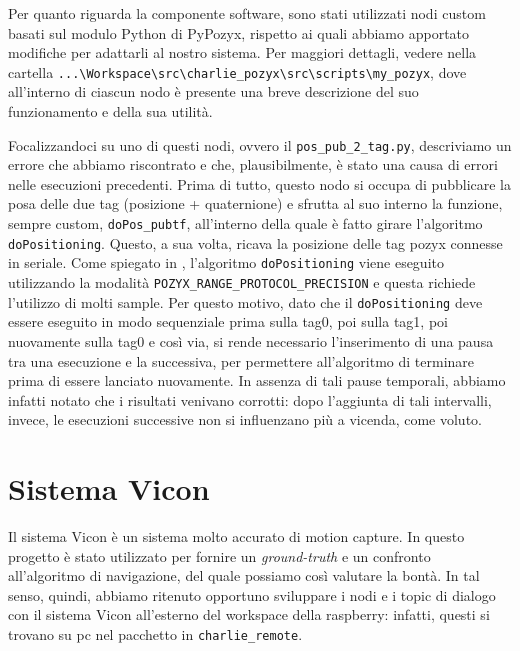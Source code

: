 Per quanto riguarda la componente software, sono stati utilizzati nodi custom basati sul modulo Python di PyPozyx, rispetto ai quali abbiamo apportato modifiche per adattarli al nostro sistema. Per maggiori dettagli, vedere nella cartella \verb|...\Workspace\src\charlie_pozyx\src\scripts\my_pozyx|, dove all'interno di ciascun nodo è presente una breve descrizione del suo funzionamento e della sua utilità.

Focalizzandoci su uno di questi nodi, ovvero il \verb|pos_pub_2_tag.py|, descriviamo un errore che abbiamo riscontrato e che, plausibilmente, è stato una causa di errori nelle esecuzioni precedenti. Prima di tutto, questo nodo si occupa di pubblicare la posa delle due tag (posizione + quaternione) e sfrutta al suo interno la funzione, sempre custom, \verb|doPos_pubtf|, all'interno della quale è fatto girare l'algoritmo \verb|doPositioning|. Questo, a sua volta, ricava la posizione delle tag pozyx connesse in seriale. Come spiegato in \cite{ctesconistudio}, l'algoritmo \verb|doPositioning| viene eseguito utilizzando la modalità \verb|POZYX_RANGE_PROTOCOL_PRECISION| e questa richiede l'utilizzo di molti sample. Per questo motivo, dato che il \verb|doPositioning| deve essere eseguito in modo sequenziale prima sulla tag0, poi sulla tag1, poi nuovamente sulla tag0 e così via, si rende necessario l'inserimento di una pausa tra una esecuzione e la successiva, per permettere all'algoritmo di terminare prima di essere lanciato nuovamente. In assenza di tali pause temporali, abbiamo infatti notato che i risultati venivano corrotti: dopo l'aggiunta di tali intervalli, invece, le esecuzioni successive non si influenzano più a vicenda, come voluto.


\section{Sistema Vicon}
\label{sez:Sistema Vicon}

Il sistema Vicon è un sistema molto accurato di motion capture. 
In questo progetto è stato utilizzato per fornire un \textit{ground-truth} e un confronto all'algoritmo di navigazione, del quale possiamo così valutare la bontà. 
In tal senso, quindi, abbiamo ritenuto opportuno sviluppare i nodi e i topic di dialogo con il sistema Vicon all'esterno del workspace della raspberry: infatti, questi si trovano su pc nel pacchetto in \texttt{charlie\_remote}.

